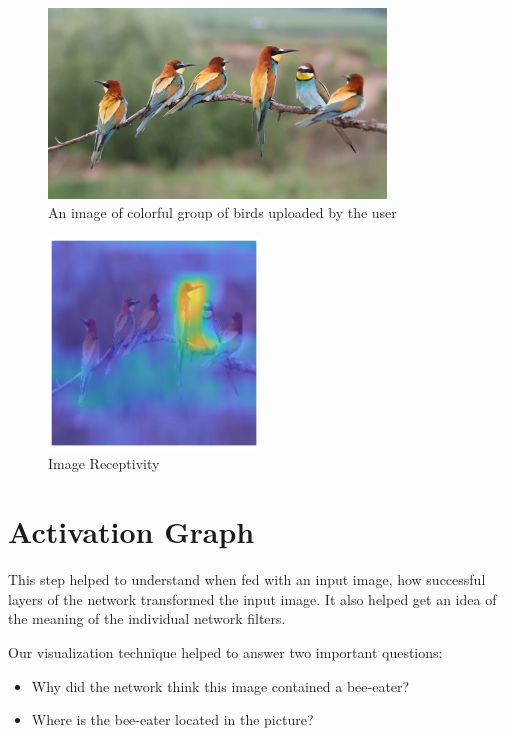 \begin{figure}[htbp]
\centering
\includegraphics[width=0.80\textwidth]{images/colorful-group-of-birds-get-together_vkmuak6_e__F0000.png}
\caption{An image of colorful group of birds uploaded by the user}
\label{fig:myFig}
\end{figure}

\begin{figure}[htbp]
\centering
\includegraphics[width=0.50\textwidth]{images/heatmap-class-activations.png}
\caption{Image Receptivity}
\label{fig:heatmap-1}
\end{figure}

\section*{Activation Graph}

This step helped to understand when fed with an input image, how successful layers of the network transformed the input image. It also helped get an idea of the meaning of the individual network filters.

Our visualization technique helped to answer two important questions:

\begin{itemize}
\item  Why did the network think this image contained a bee-eater?
\item Where is the bee-eater located in the picture?
\end{itemize}

